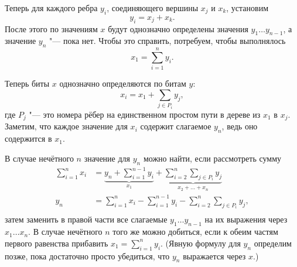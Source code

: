 \documentclass[a4paper, 14pt]{extarticle}
\begin{document}
Теперь для каждого ребра $y_i$, соединяющего вершины $x_j$ и $x_k$, установим
\[
y_i = x_j + x_k.
\]
После этого по значениям $x$ будут однозначно определены значения $y_1 \dots
y_{n-1}$, а значение $y_n$ "--- пока нет. Чтобы это справить, потребуем, чтобы
выполнялось
\[
x_1 = \sum_{i = 1}^n y_i.
\]

Теперь биты $x$ однозначно определяются по битам $y$:
\[
x_i = x_1 + \sum_{j \in P_i} y_j,
\]
где $P_j$ "--- это номера рёбер на единственном простом пути в дереве из $x_1$ в
$x_j$. Заметим, что каждое значение для $x_i$ содержит слагаемое $y_n$, ведь оно
содержится в $x_1$.

В случае нечётного $n$ значение для $y_n$ можно найти, если рассмотреть сумму
\[
\begin{aligned}
\sum_{i=1}^n x_i &= \underbrace{y_n + \sum_{i=1}^{n-1} y_i}_{x_1} +
\underbrace{\sum_{i = 2}^n \sum_{j \in P_i} y_j}_{x_2 + \dots + x_n}
\\
y_n &= \sum_{i=1}^n x_i - \sum_{i = 1}^{n-1} y_i - \sum_{i = 2}^n \sum_{j \in P_i} y_j, \\
\end{aligned}
\]
затем заменить в правой части все слагаемые $y_1 \dots y_{n-1}$ на их выражения
через ${x_1 \dots x_n}$. В случае нечётного $n$ того же можно добиться, если
к обеим частям первого равенства прибавить $x_1 = \sum_{i=1}^n y_i$. (Явную
формулу для $y_n$ определим позже, пока достаточно просто убедиться, что $y_n$
выражается через $x$.)
\end{document}
